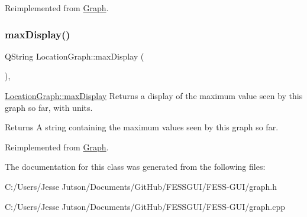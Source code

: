 Reimplemented from \hyperlink{class_graph}{Graph}.

\hypertarget{class_location_graph_a8ac355338680e55af26cb3e74b76d278}{}\label{class_location_graph_a8ac355338680e55af26cb3e74b76d278} 
\subsubsection{\texorpdfstring{max\+Display()}{maxDisplay()}}
{\footnotesize\ttfamily Q\+String Location\+Graph\+::max\+Display (\begin{DoxyParamCaption}{ }\end{DoxyParamCaption})\hspace{0.3cm}{\ttfamily [override]}, {\ttfamily [virtual]}}



\hyperlink{class_location_graph_a8ac355338680e55af26cb3e74b76d278}{Location\+Graph\+::max\+Display} Returns a display of the maximum value seen by this graph so far, with units. 

\begin{DoxyReturn}{Returns}
A string containing the maximum values seen by this graph so far. 
\end{DoxyReturn}


Reimplemented from \hyperlink{class_graph}{Graph}.



The documentation for this class was generated from the following files\+:\begin{DoxyCompactItemize}
\item 
C\+:/\+Users/\+Jesse Jutson/\+Documents/\+Git\+Hub/\+F\+E\+S\+S\+G\+U\+I/\+F\+E\+S\+S-\/\+G\+U\+I/graph.\+h\item 
C\+:/\+Users/\+Jesse Jutson/\+Documents/\+Git\+Hub/\+F\+E\+S\+S\+G\+U\+I/\+F\+E\+S\+S-\/\+G\+U\+I/graph.\+cpp\end{DoxyCompactItemize}
